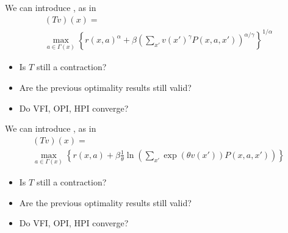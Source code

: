 \documentclass[dvipsnames]{beamer}
\begin{document}
\begin{frame}
    
    We can introduce , as in
    \begin{multline*}
        (Tv)(x) = \\
        \max_{a \in \Gamma(x)}
        \left\{
            r(x, a)^\alpha + \beta 
                \left(
                    \sum_{x'} v(x')^\gamma P(x,a, x')
                \right)^{\alpha / \gamma}
        \right\}^{1/\alpha}
    \end{multline*}


            \vspace{0.5em}
            \vspace{0.5em}
            \vspace{0.5em}
    \begin{itemize}
        \item Is $T$ still a contraction?
            \vspace{0.5em}
        \item Are the previous optimality results still valid?
            \vspace{0.5em}
        \item Do VFI, OPI, HPI converge?
    \end{itemize}

\end{frame}


\begin{frame}
    
    We can introduce , as in
    \begin{multline*}
        (Tv)(x) = \\
        \max_{a \in \Gamma(x)}
            \left\{
                r(x, a) + \beta \frac{1}{\theta} \ln 
                \left(
                    \sum_{x'} \exp(\theta v(x')) P(x, a, x')
                \right)
            \right\}
    \end{multline*}

            \vspace{0.5em}
            \vspace{0.5em}
            \vspace{0.5em}

    \begin{itemize}
        \item Is $T$ still a contraction?
            \vspace{0.5em}
        \item Are the previous optimality results still valid?
            \vspace{0.5em}
        \item Do VFI, OPI, HPI converge?
    \end{itemize}

\end{frame}
\end{document}
